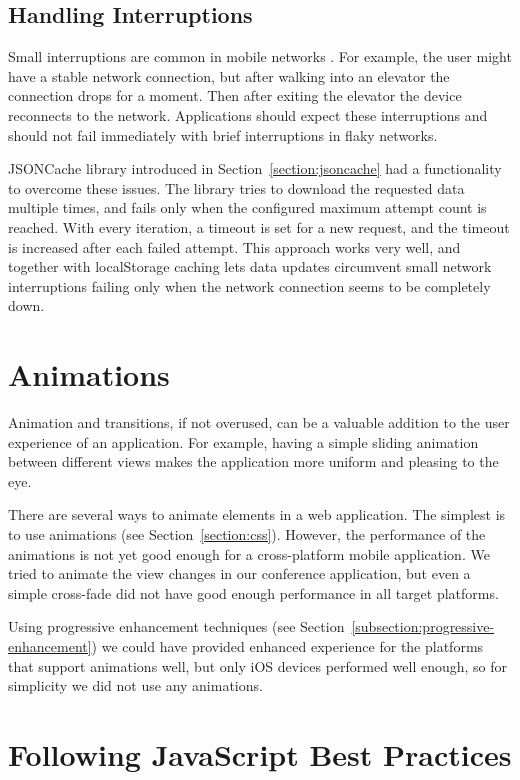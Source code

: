 \subsection{Handling Interruptions}

Small interruptions are common in mobile networks
\cite{zandy2002reliable}. For example, the user might have a stable
network connection, but after walking into an elevator the connection
drops for a moment. Then after exiting the elevator the device
reconnects to the network. Applications should expect these
interruptions and should not fail immediately with brief interruptions
in flaky networks.

JSONCache library introduced in Section~\ref{section:jsoncache} had a
functionality to overcome these issues. The library tries to download
the requested data multiple times, and fails only when the configured
maximum attempt count is reached. With every iteration, a timeout is
set for a new request, and the timeout is increased after each failed
attempt. This approach works very well, and together with localStorage
caching lets data updates circumvent small network interruptions
failing only when the network connection seems to be completely down.

\section{Animations}
\label{section:animations}

Animation and transitions, if not overused, can be a valuable addition
to the user experience of an application. For example, having a simple
sliding animation between different views makes the application more
uniform and pleasing to the eye.

There are several ways to animate elements in a web application. The
simplest is to use  animations (see
Section~\ref{section:css}). However, the performance of the animations
is not yet good enough for a cross-platform mobile application. We
tried to animate the view changes in our conference application, but
even a simple cross-fade did not have good enough performance in all
target platforms.

Using progressive enhancement techniques (see
Section~\ref{subsection:progressive-enhancement}) we could have
provided enhanced experience for the platforms that support animations
well, but only iOS devices performed well enough, so for simplicity we
did not use any animations.

\section{Following JavaScript Best Practices}
\label{section:js-best-practices}

